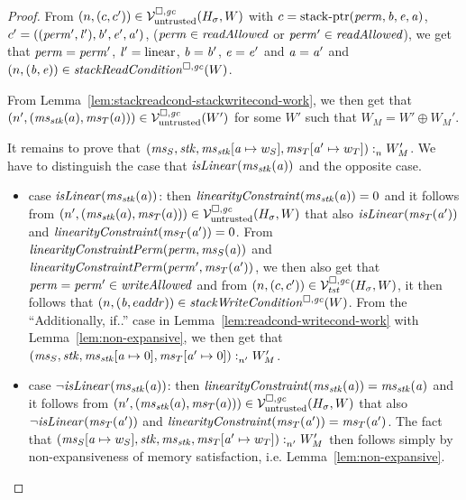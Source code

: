 \begin{proof}
  From $\npair{(c,c')}\in\lrv(H_\sigma,W)$ with $c = \stkptr{\perm,\baddr,\eaddr,\aaddr}$, $c' = ((\perm',\lin'),\baddr',\eaddr',\aaddr')$, ($\perm \in \readAllowed{}$ or $\perm' \in \readAllowed{}$), we get that $\perm = \perm'$, $\lin' = \linear$, $\baddr = \baddr'$, $\eaddr = \eaddr'$ and $\aaddr = \aaddr'$ and $\npair{(\baddr,\eaddr)} \in \stackReadCond{W}$.

  From Lemma~\ref{lem:stackreadcond-stackwritecond-work}, we then get that $\npair[n']{(\ms_\stk(a),\ms_T(a))}\in\lrv(W')$ for some $W'$ such that $W_M = W' \oplus W_M'$.
  

  It remains to prove that $\memSat{(\ms_S,\stk,\ms_\stk\update{\aaddr}{w_S},\ms_T\update{\aaddr'}{w_T})}{W_M'}$.
  We have to distinguish the case that $\isLinear{\ms_\stk(\aaddr)}$ and the opposite case.
  \begin{itemize}
  \item case $\isLinear{\ms_\stk(\aaddr)}$: then $\linCons{\ms_\stk(\aaddr)} = 0$ and it follows from $\npair[n']{(\ms_\stk(a),\ms_T(a))}\in\lrv(H_\sigma,W)$ that also $\isLinear{\ms_T(\aaddr')}$  and $\linCons{\ms_T(\aaddr')} = 0$. 
    From $\linConsPerm{\perm}{\ms_S(\aaddr)}$ and $\linConsPerm{\perm'}{\ms_T(\aaddr')}$, we then also get that $\perm = \perm' \in \writeAllowed{}$ and from $\npair{(c,c')}\in\lrvg{\trust}(H_\sigma,W)$, it then follows that $\npair{(\baddr,eaddr)} \in \stackWriteCond{W}$.
    From the ``Additionally, if..'' case in Lemma~\ref{lem:readcond-writecond-work} with Lemma~\ref{lem:non-expansive}, we then get that $\memSat[n']{(\ms_S,\stk,\ms_\stk\update{\aaddr}{0},\ms_T\update{\aaddr'}{0})}{W_M'}$.

  \item case $\neg\isLinear{\ms_\stk(\aaddr)}$: then $\linCons{\ms_\stk(\aaddr)} = \ms_\stk(\aaddr)$ and it follows from $\npair[n']{(\ms_\stk(a),\ms_T(a))}\in\lrv(H_\sigma,W)$ that also $\neg\isLinear{\ms_T(\aaddr')}$  and $\linCons{\ms_T(\aaddr')} = \ms_T(\aaddr')$.
    The fact that $\memSat[n']{(\ms_S\update{\aaddr}{w_S},\stk,\ms_\stk,\ms_T\update{\aaddr'}{w_T})}{W_M'}$ then follows simply by non-expansiveness of memory satisfaction, i.e. Lemma~\ref{lem:non-expansive}.
  \end{itemize}
\end{proof}

